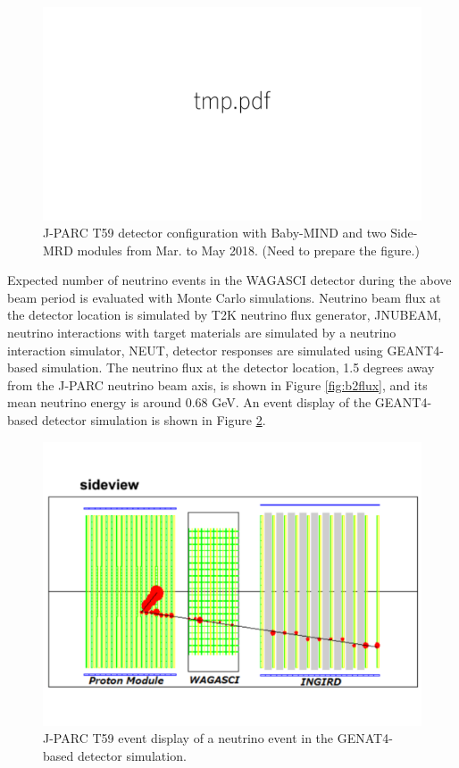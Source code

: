\begin{figure}[tbh]
\begin{center}
\includegraphics[width=0.8\linewidth]{fig/tmp.pdf}
\end{center}
\caption{
J-PARC T59 detector configuration with Baby-MIND and two Side-MRD modules from Mar. to May 2018.
(Need to prepare the figure.)}
\label{fig:det_config_mar_may2018}
\end{figure}


Expected number of neutrino events in the WAGASCI detector during the above beam period is evaluated with Monte Carlo simulations. 
Neutrino beam flux at the detector location is simulated by T2K neutrino flux generator, JNUBEAM, neutrino interactions with target materials are simulated by a neutrino interaction simulator, NEUT, detector responses are simulated using GEANT4-based simulation. 
The neutrino flux at the detector location, 1.5 degrees away from the J-PARC neutrino beam axis, is shown in Figure \ref{fig:b2flux}, and its mean neutrino energy is around 0.68 GeV.
An event display of the GEANT4-based detector simulation is shown in Figure \ref{fig:t59_event_display_oct_dec_2017}.

\begin{figure}[tbh]
\begin{center}
\includegraphics[width=0.8\linewidth]{fig/t59_event_display_oct_dec_2017.pdf}
\end{center}
\caption{
J-PARC T59 event display of a neutrino event in the GENAT4-based detector simulation.
}
\label{fig:t59_event_display_oct_dec_2017}
\end{figure}


